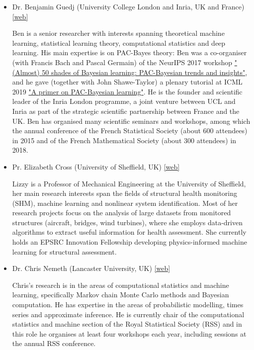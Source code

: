 \documentclass[11pt,a4paper]{scrartcl}
\theoremstyle{plain}  %
\begin{document}
\begin{itemize}
  \item Dr. Benjamin Guedj (University College London and Inria, UK and France) \href{https://bguedj.github.io}{[web]}

  Ben is a senior researcher with interests spanning theoretical machine learning, statistical learning theory, computational statistics and deep learning. His main expertise is on PAC-Bayes theory: Ben was a co-organiser (with Francis Bach and Pascal Germain) of the NeurIPS 2017 workshop \href{https://bguedj.github.io/nips2017/}{"(Almost) 50 shades of Bayesian learning: PAC-Bayesian trends and insights"}, and he gave (together with John Shawe-Taylor) a plenary tutorial at ICML 2019 \href{https://icml.cc/Conferences/2019/ScheduleMultitrack?event=4338}{"A primer on PAC-Bayesian learning"}. He is the founder and scientific leader of the Inria London programme, a joint venture between UCL and Inria as part of the strategic scientific partnership between France and the UK. Ben has organised many scientific seminars and workshops, among which the annual conference of the French Statistical Society (about 600 attendees) in 2015 and of the French Mathematical Society (about 300 attendees) in 2018.

  \item Pr. Elizabeth Cross (University of Sheffield, UK) \href{https://www.sheffield.ac.uk/mecheng/people/academic/elizabeth-cross}{[web]}

  Lizzy is a Professor of Mechanical Engineering at the University of Sheffield, her main research interests span the fields of structural health monitoring (SHM), machine learning and nonlinear system identification. Most of her research projects focus on the analysis of large datasets from monitored structures (aircraft, bridges, wind turbines), where she employs data-driven algorithms to extract useful information for health assessment. She currently holds an EPSRC Innovation Fellowship developing physics-informed machine learning for structural assessment. 

  \item Dr. Chris Nemeth (Lancaster University, UK) \href{http://www.lancs.ac.uk/~nemeth/}{[web]}

  Chris’s research is in the areas of computational statistics and machine learning, specifically Markov chain Monte Carlo methods and Bayesian computation. He has expertise in the areas of probabilistic modelling, times series and approximate inference. He is currently chair of the computational statistics and machine section of the Royal Statistical Society (RSS) and in this role he organises at least four workshops each year, including sessions at the annual RSS conference. 


\end{itemize}
\end{document}
